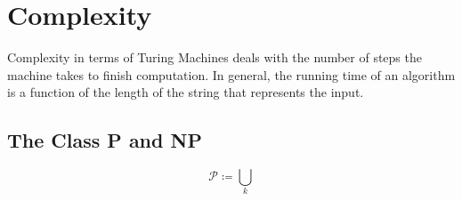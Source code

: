 \chapter{Complexity}

Complexity in terms of Turing Machines deals with the number of steps the machine takes to finish computation. In general, the running time of an algorithm is a function of the length of the string that represents the input.

\section{The Class P and NP}

\[ \mathcal{P} \coloneq \bigcup_k \]